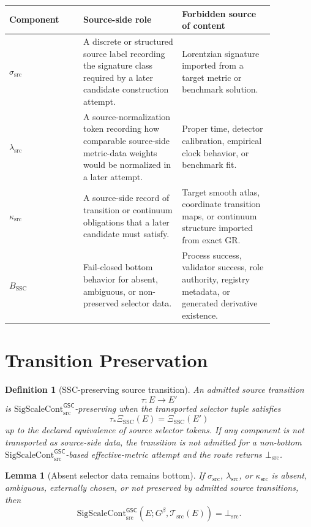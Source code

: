 \documentclass[11pt]{article}
\newcommand{\Gbeta}{G^{\beta}}
\newcommand{\SigScaleCont}{\mathrm{SigScaleCont}_{\mathrm{src}}^{\mathsf{GSC}}}
\newcommand{\SigTok}{\sigma_{\mathrm{src}}}
\newcommand{\ScaleTok}{\lambda_{\mathrm{src}}}
\newcommand{\ContTok}{\kappa_{\mathrm{src}}}
\newcommand{\BottomSrc}{\bot_{\mathrm{src}}}
\newtheorem{definition}{Definition}
\newtheorem{lemma}{Lemma}
\begin{document}
\begin{longtable}{p{0.24\linewidth}p{0.32\linewidth}p{0.30\linewidth}}
\toprule
Component & Source-side role & Forbidden source of content \\
\midrule
\(\SigTok\) & A discrete or structured source label recording the signature
class required by a later candidate construction attempt. & Lorentzian
signature imported from a target metric or benchmark solution. \\
\(\ScaleTok\) & A source-normalization token recording how comparable
source-side metric-data weights would be normalized in a later attempt. &
Proper time, detector calibration, empirical clock behavior, or benchmark
fit. \\
\(\ContTok\) & A source-side record of transition or continuum obligations
that a later candidate must satisfy. & Target smooth atlas, coordinate
transition maps, or continuum structure imported from exact GR. \\
\(B_{\mathrm{SSC}}\) & Fail-closed bottom behavior for absent, ambiguous, or
non-preserved selector data. & Process success, validator success, role
authority, registry metadata, or generated derivative existence. \\
\bottomrule
\end{longtable}

\section{Transition Preservation}

\begin{definition}[SSC-preserving source transition]
An admitted source transition
\[
  \tau:E\to E'
\]
is \(\SigScaleCont\)-preserving when the transported selector tuple satisfies
\[
  \tau_{\ast}\Xi_{\mathrm{SSC}}(E)=\Xi_{\mathrm{SSC}}(E')
\]
up to the declared equivalence of source selector tokens. If any component is
not transported as source-side data, the transition is not admitted for a
non-bottom \(\SigScaleCont\)-based effective-metric attempt and the route
returns \(\BottomSrc\).
\end{definition}

\begin{lemma}[Absent selector data remains bottom]
If \(\SigTok\), \(\ScaleTok\), or \(\ContTok\) is absent, ambiguous, externally
chosen, or not preserved by admitted source transitions, then
\[
  \SigScaleCont(E;\Gbeta,\mathcal T_{\mathrm{src}}(E))=\BottomSrc .
\]
\end{lemma}
\end{document}
